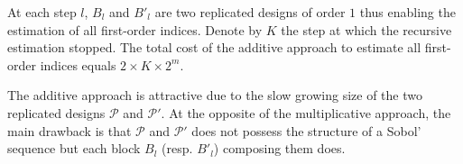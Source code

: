 \documentclass[]{elsarticle}
\theoremstyle{definition}
\newcommand{\bvec}[1]{\boldsymbol{#1}}
\newcommand{\vi}{\bvec{i}}
\newcommand{\ve}{\bvec{e}}
\begin{document}
 At each step $l$, $B_l$ and ${B'}_l$ are two replicated designs of order $1$ thus enabling the estimation of all first-order indices. Denote by $K$ the step at which the recursive estimation stopped. The total cost of the additive approach to estimate all first-order indices equals $2 \times K \times 2^m$. 
 
The additive approach is attractive due to the slow growing size of the two replicated designs $\mathcal{P}$ and $\mathcal{P}'$. At the opposite of the multiplicative approach, the main drawback is that $\mathcal{P}$ and $\mathcal{P}'$ does not possess the structure of a Sobol' sequence but each block $B_l$ (resp. $B'_l$) composing them does.


%
%
\end{document}
